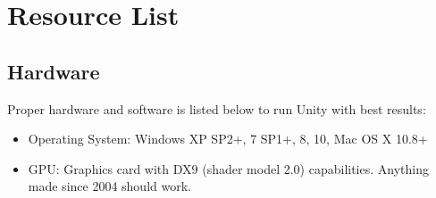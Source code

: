 \section{Resource List}
\label{sec:resource}
\subsection{Hardware}
Proper hardware and software is listed below to run Unity with best results:
\begin{itemize}
 \item Operating System: Windows XP SP2+, 7 SP1+, 8, 10, Mac OS X 10.8+
 \item GPU: Graphics card with DX9 (shader model 2.0) capabilities. Anything made since 2004 should work.
\end{itemize}

